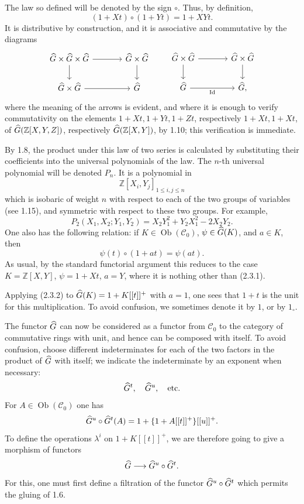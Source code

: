 \documentclass[11pt]{article}
\begin{document}
The law so defined will be denoted by the sign \(\circ\). Thus, by definition,
\begin{equation}\tag{2.3.1}
  (1+Xt)\circ(1+Yt)=1+XYt .
\end{equation}
It is distributive by construction, and it is associative and commutative by the diagrams
\[
\begin{tikzcd}[column sep=large]
\Ghat\times\Ghat\times\Ghat \arrow[r] \arrow[d] &
\Ghat\times\Ghat \arrow[d]\\
\Ghat\times\Ghat \arrow[r] & \Ghat
\end{tikzcd}
\qquad
\begin{tikzcd}[column sep=large]
\Ghat\times\Ghat \arrow[r] \arrow[d] &
\Ghat\times\Ghat \arrow[d]\\
\Ghat \arrow[r,"\id"'] & \Ghat,
\end{tikzcd}
\]
where the meaning of the arrows is evident, and where it is enough to verify commutativity on the elements \(1+Xt,1+Yt,1+Zt\), respectively \(1+Xt,1+Xt\), of \(\widehat G(\mathbb Z[X,Y,Z])\), respectively \(\widehat G(\mathbb Z[X,Y])\), by 1.10; this verification is immediate.

By 1.8, the product under this law of two series is calculated by substituting their coefficients into the universal polynomials of the law. The \(n\)-th universal polynomial will be denoted \(P_n\). It is a polynomial in
\[
  \mathbb Z[X_i,Y_j]_{1\leq i,j\leq n}
\]
which is isobaric of weight \(n\) with respect to each of the two groups of variables (see 1.15), and symmetric with respect to these two groups. For example,
\[
  P_2(X_1,X_2;Y_1,Y_2)=X_2Y_1^2+Y_2X_1^2-2X_2Y_2 .
\]
One also has the following relation: if \(K\in\operatorname{Ob}(\mathcal C_0)\), \(\psi\in\widehat G(K)\), and \(a\in K\), then
\begin{equation}\tag{2.3.2}
  \psi(t)\circ(1+at)=\psi(at).
\end{equation}
As usual, by the standard functorial argument this reduces to the case \(K=\mathbb Z[X,Y]\), \(\psi=1+Xt\), \(a=Y\), where it is nothing other than (2.3.1).

Applying (2.3.2) to \(\widehat G(K)=1+K[[t]]^+\) with \(a=1\), one sees that \(1+t\) is the unit for this multiplication. To avoid confusion, we sometimes denote it by \(1\), or by \(1_{\circ}\).

The functor \(\widehat G\) can now be considered as a functor from \(\mathcal C_0\) to the category of commutative rings with unit, and hence can be composed with itself. To avoid confusion, choose different indeterminates for each of the two factors in the product of \(\widehat G\) with itself; we indicate the indeterminate by an exponent when necessary:
\[
  \widehat G^t,\quad \widehat G^u,\quad\text{etc.}
\]
For \(A\in\operatorname{Ob}(\mathcal C_0)\) one has
\[
  \widehat G^u\circ \widehat G^t(A)=1+\{1+A[[t]]^+\}[[u]]^+.
\]
To define the operations \(\lambda^i\) on \(1+K[[t]]^+\), we are therefore going to give a morphism of functors
\[
  \widehat G\longrightarrow \widehat G^u\circ\widehat G^t.
\]
For this, one must first define a filtration of the functor \(\widehat G^u\circ\widehat G^t\) which permits the gluing of 1.6.
\end{document}
